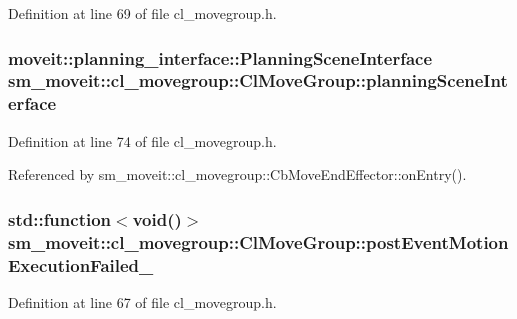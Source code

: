 Definition at line 69 of file cl\+\_\+movegroup.\+h.

\subsubsection[{\texorpdfstring{planning\+Scene\+Interface}{planningSceneInterface}}]{\setlength{\rightskip}{0pt plus 5cm}moveit\+::planning\+\_\+interface\+::\+Planning\+Scene\+Interface sm\+\_\+moveit\+::cl\+\_\+movegroup\+::\+Cl\+Move\+Group\+::planning\+Scene\+Interface}\hypertarget{classsm__moveit_1_1cl__movegroup_1_1ClMoveGroup_a26b5c9e0aef1cd67ee977a756b69cf76}{}\label{classsm__moveit_1_1cl__movegroup_1_1ClMoveGroup_a26b5c9e0aef1cd67ee977a756b69cf76}


Definition at line 74 of file cl\+\_\+movegroup.\+h.



Referenced by sm\+\_\+moveit\+::cl\+\_\+movegroup\+::\+Cb\+Move\+End\+Effector\+::on\+Entry().

\subsubsection[{\texorpdfstring{post\+Event\+Motion\+Execution\+Failed\+\_\+}{postEventMotionExecutionFailed_}}]{\setlength{\rightskip}{0pt plus 5cm}std\+::function$<$void()$>$ sm\+\_\+moveit\+::cl\+\_\+movegroup\+::\+Cl\+Move\+Group\+::post\+Event\+Motion\+Execution\+Failed\+\_\+\hspace{0.3cm}{\ttfamily [private]}}\hypertarget{classsm__moveit_1_1cl__movegroup_1_1ClMoveGroup_a0d97eb41759179bdaa355bb378a60f33}{}\label{classsm__moveit_1_1cl__movegroup_1_1ClMoveGroup_a0d97eb41759179bdaa355bb378a60f33}


Definition at line 67 of file cl\+\_\+movegroup.\+h.



